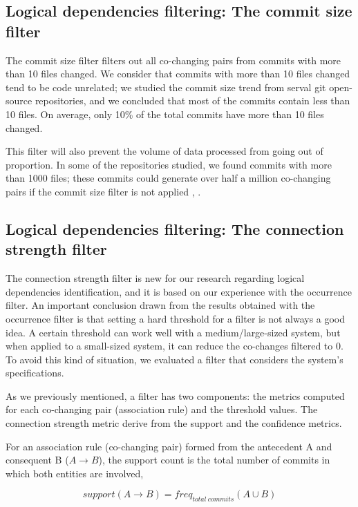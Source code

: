 \documentclass[runningheads]{comsis2}
\begin{document}
\subsection{Logical dependencies filtering: The commit size filter}
\label{commit_filter}

The commit size filter filters out all co-changing pairs from commits with more than 10 files changed. We consider that commits with more than 10 files changed tend to be code unrelated; we studied the commit size trend from serval git open-source repositories, and we concluded that most of the commits contain less than 10 files. On average, only 10\% of the total commits have more than 10 files changed. 

This filter will also prevent the volume of data processed from going out of proportion. In some of the repositories studied, we found commits with more than 1000 files; these commits could generate over half a million co-changing pairs if the commit size filter is not applied \cite{enase19}, \cite{saci19}. 



\subsection{Logical dependencies filtering: The connection strength filter}
\label{strength_filter}


The connection strength filter is new for our research regarding logical dependencies identification, and it is based on our experience with the occurrence filter.
An important conclusion drawn from the results obtained with the occurrence filter is that setting a hard threshold for a filter is not always a good idea. A certain threshold can work well with a medium/large-sized system, but when applied to a small-sized system, it can reduce the co-changes filtered to 0. To avoid this kind of situation, we evaluated a filter that considers the system's specifications. 


As we previously mentioned, a filter has two components: the metrics computed for each co-changing pair (association rule) and the threshold values. The connection strength metric derive from the support and the confidence metrics.

For an association rule (co-changing pair) formed from the antecedent A and consequent B ($A \rightarrow B$), 
the support count is the total number of commits in which both entities are involved,


\begin{equation}
support (A \rightarrow B) = freq_{total\ commits} {(A \cup B)}
\end{equation}
\end{document}
